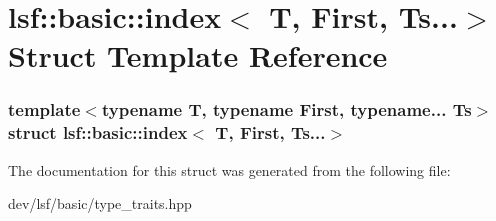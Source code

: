 \hypertarget{structlsf_1_1basic_1_1index_3_01T_00_01First_00_01Ts_8_8_8_4}{
\section{lsf::basic::index$<$ T, First, Ts...$>$ Struct Template Reference}
\label{structlsf_1_1basic_1_1index_3_01T_00_01First_00_01Ts_8_8_8_4}
}
\subsubsection*{template$<$typename T, typename First, typename... Ts$>$ struct lsf::basic::index$<$ T, First, Ts...$>$}



The documentation for this struct was generated from the following file:\begin{DoxyCompactItemize}
\item 
dev/lsf/basic/type\_\-traits.hpp\end{DoxyCompactItemize}

